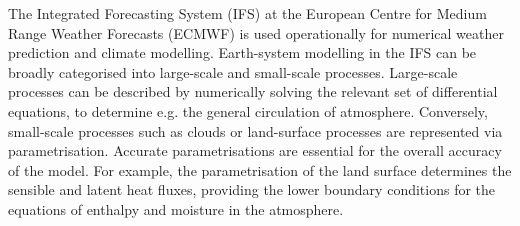 \documentclass[twocolumn]{article}
\begin{document}
\noindent The Integrated Forecasting System (IFS) at the European Centre for Medium Range Weather Forecasts (ECMWF) is used operationally for numerical weather prediction and climate modelling. Earth-system modelling in the IFS can be broadly categorised into large-scale and small-scale processes. Large-scale processes can be described by numerically solving the relevant set of differential equations, to determine e.g. the general circulation of atmosphere. Conversely, small-scale processes such as clouds or land-surface processes are represented via parametrisation. Accurate parametrisations are essential for the overall accuracy of the model. For example, the parametrisation of the land surface determines the sensible and latent heat fluxes, providing the lower boundary conditions for the equations of enthalpy and moisture in the atmosphere\cite{p16960}. \newline 
\end{document}
